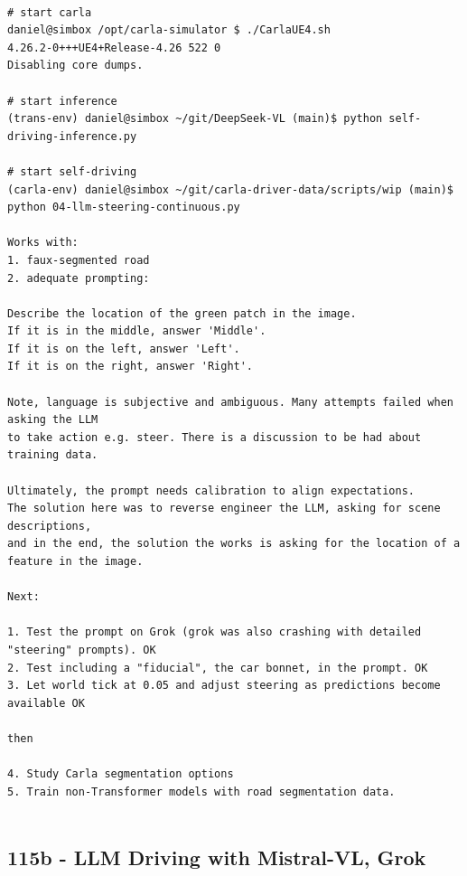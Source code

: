 \begin{verbatim}

# start carla
daniel@simbox /opt/carla-simulator $ ./CarlaUE4.sh 
4.26.2-0+++UE4+Release-4.26 522 0
Disabling core dumps.

# start inference
(trans-env) daniel@simbox ~/git/DeepSeek-VL (main)$ python self-driving-inference.py

# start self-driving
(carla-env) daniel@simbox ~/git/carla-driver-data/scripts/wip (main)$ python 04-llm-steering-continuous.py

Works with:
1. faux-segmented road
2. adequate prompting:

Describe the location of the green patch in the image.
If it is in the middle, answer 'Middle'.
If it is on the left, answer 'Left'.
If it is on the right, answer 'Right'.

Note, language is subjective and ambiguous. Many attempts failed when asking the LLM
to take action e.g. steer. There is a discussion to be had about training data.

Ultimately, the prompt needs calibration to align expectations.
The solution here was to reverse engineer the LLM, asking for scene descriptions, 
and in the end, the solution the works is asking for the location of a feature in the image.

Next:

1. Test the prompt on Grok (grok was also crashing with detailed "steering" prompts). OK
2. Test including a "fiducial", the car bonnet, in the prompt. OK
3. Let world tick at 0.05 and adjust steering as predictions become available OK

then

4. Study Carla segmentation options
5. Train non-Transformer models with road segmentation data.


\end{verbatim}

\subsection{115b - LLM Driving with Mistral-VL, Grok}
\label{app_res:115b}

